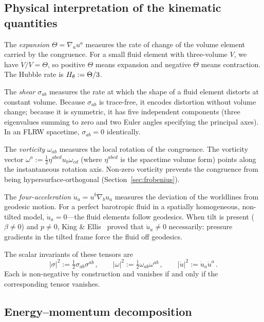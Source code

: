 \subsection{Physical interpretation of the kinematic
  quantities}\label{sec:phys-interp}

The \emph{expansion} $\Theta = \nabla_a u^a$ measures the
rate of change of the volume element carried by the congruence.
For a small fluid element with three-volume $V$, we have
$\dot{V}/V = \Theta$, so positive $\Theta$ means expansion and
negative $\Theta$ means contraction.  The Hubble rate is
$H_\theta := \Theta/3$.

The \emph{shear} $\sigma_{ab}$ measures the rate at which the
shape of a fluid element distorts at constant volume.  Because
$\sigma_{ab}$ is trace-free, it encodes distortion without
volume change; because it is symmetric, it has five independent
components (three eigenvalues summing to zero and two Euler
angles specifying the principal axes).  In an FLRW spacetime,
$\sigma_{ab} = 0$ identically.

The \emph{vorticity} $\omega_{ab}$ measures the local rotation
of the congruence.  The vorticity vector
$\omega^a := \frac{1}{2}\eta^{abcd}u_b\omega_{cd}$ (where
$\eta^{abcd}$ is the spacetime volume form) points along the
instantaneous rotation axis.  Non-zero vorticity prevents the
congruence from being hypersurface-orthogonal
(Section~\ref{sec:frobenius}).

The \emph{four-acceleration} $\dot{u}_a = u^b\nabla_b u_a$
measures the deviation of the worldlines from geodesic motion.
For a perfect barotropic fluid in a spatially homogeneous,
non-tilted model, $\dot{u}_a = 0$---the fluid elements follow
geodesics.  When tilt is present ($\beta \neq 0$) and
$p \neq 0$, King \& Ellis~\cite{KingEllis1973} proved that
$\dot{u}_a \neq 0$ necessarily: pressure gradients in the
tilted frame force the fluid off geodesics.

The scalar invariants of these tensors are
\begin{equation}\label{eq:scalar-invariants}
|\sigma|^2 := \tfrac{1}{2}\sigma_{ab}\sigma^{ab}\,,\qquad
|\omega|^2 := \tfrac{1}{2}\omega_{ab}\omega^{ab}\,,\qquad
|\dot{u}|^2 := \dot{u}_a\dot{u}^a\,.
\end{equation}
Each is non-negative by construction and vanishes if and only if
the corresponding tensor vanishes.


\subsection{Energy--momentum decomposition}\label{sec:em-decomp}

